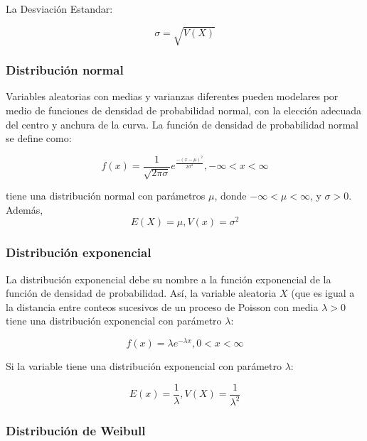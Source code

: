 La Desviación Estandar:

\begin{equation*}
\sigma=\sqrt{V(X)}
\end{equation*}

\subsubsection{Distribución normal}

Variables aleatorias con medias y varianzas diferentes pueden modelares por medio de funciones de densidad de probabilidad normal, con la elección adecuada del centro y anchura de la curva. La función de densidad de probabilidad normal se define como:

\begin{equation*}
f(x)=\frac{1}{\sqrt{2\pi\sigma}}e^{\frac{-(x-\mu)^2}{2\sigma^2}}  ,  -\infty<x<\infty
\end{equation*}

tiene una distribución normal con parámetros $\mu$, donde $-\infty<\mu<\infty$, y $\sigma>0$.\\

Además,
\begin{equation*}
E(X)=\mu , V(x)=\sigma^2
\end{equation*}

\subsubsection{Distribución exponencial}

La distribución exponencial debe su nombre a la función exponencial de la función de densidad de probabilidad. Así, la variable aleatoria $X$ (que es igual a la distancia entre conteos sucesivos de un proceso de Poisson con media $\lambda>0$ tiene una distribución exponencial con parámetro $\lambda$:

\begin{equation*}
f(x)=\lambda e^{-\lambda x}, 0<x<\infty
\end{equation*}

Si la variable tiene una distribución exponencial con parámetro $\lambda$:

\begin{equation*}
E(x)=\frac{1}{\lambda}, V(X)=\frac{1}{\lambda^2}
\end{equation*}

\subsubsection{Distribución de Weibull}

